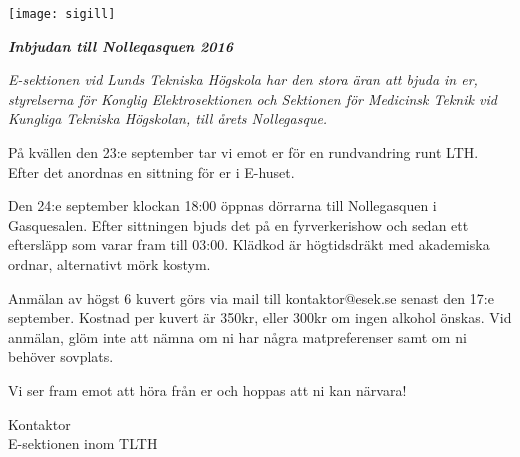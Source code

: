 \documentclass[11pt]{article}
\def\date{2016}
\def\doctitle{Inbjudan till Nolleqasquen \date}
\def\rec{styrelserna för Konglig Elektrosektionen och Sektionen för Medicinsk Teknik vid Kungliga Tekniska Högskolan}
\begin{document}
    \begin{center}
        \texttt{[image: sigill]}
        \par
        \vspace*{7mm}

        \textit{\textbf{\huge \doctitle}}
    \end{center}

    {\it
    E-sektionen vid Lunds Tekniska Högskola har den stora äran att bjuda in er, {\rec}, till årets Nollegasque.

    På kvällen den 23:e september tar vi emot er för en rundvandring runt LTH. Efter det anordnas en sittning för er i E-huset.

    Den 24:e september klockan 18:00 öppnas dörrarna till Nollegasquen i Gasquesalen. Efter sittningen bjuds det på en fyrverkerishow och sedan ett eftersläpp som varar fram till 03:00. Klädkod är högtidsdräkt med akademiska ordnar, alternativt mörk kostym.

    Anmälan av högst 6 kuvert görs via mail till kontaktor@esek.se senast den 17:e september. Kostnad per kuvert är 350kr, eller 300kr om ingen alkohol önskas. Vid anmälan, glöm inte att nämna om ni har några matpreferenser samt om ni behöver sovplats.

    Vi ser fram emot att höra från er och hoppas att ni kan närvara!
    }

    \begin{signatures}{1}
    \signature{Erik Månsson}{Kontaktor\\E-sektionen inom TLTH}
    \end{signatures}
\end{document}
